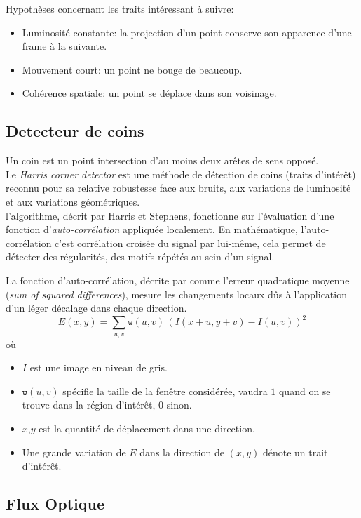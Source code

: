 \documentclass[a4paper,12pt]{report}
\begin{document}
Hypothèses concernant les traits intéressant à suivre:
\begin{itemize}
\item Luminosité constante: la projection d'un point conserve son apparence d'une frame à la suivante.
\item Mouvement court: un point ne bouge de beaucoup.
\item Cohérence spatiale: un point se déplace dans son voisinage.
\end{itemize}

\subsection{Detecteur de coins}
Un coin est un point intersection d'au moins deux arêtes de sens opposé.\\

Le \textit{Harris corner detector} est une méthode de détection de coins (traits d'intérêt) reconnu pour sa relative robustesse face aux bruits, aux variations de luminosité et aux variations géométriques. \\

l'algorithme, décrit par Harris et Stephens, fonctionne sur l'évaluation d'une fonction d'\textit{auto-corrélation} appliquée localement. 
En mathématique, l'auto-corrélation c'est corrélation croisée du signal par lui-même, cela permet de détecter des régularités, des motifs répétés au sein d'un signal.   

La fonction d'auto-corrélation, décrite par \cite{q} comme l'erreur quadratique moyenne (\textit{sum of squared differences}), mesure les changements locaux dûs à l'application d'un léger décalage dans chaque direction.\\
$$
E(x,y) = \sum_{u,v} \texttt{w}(u,v) \, \left( I(x+u,y+v) - I(u,v)\right)^2
$$
où
\begin{itemize}
\item[]$I$ est une image en niveau de gris.
\item[]$\texttt{w}(u,v)$ spécifie la taille de la fenêtre considérée, vaudra $1$ quand on se trouve dans la région d'intérêt, $0$ sinon.
\item[]$x$,$y$ est la quantité de déplacement dans une direction.
\item[]Une grande variation de $E$ dans la direction de $(x,y)$ dénote un trait d'intérêt.\\
\end{itemize}

\subsection{Flux Optique}
\end{document}
